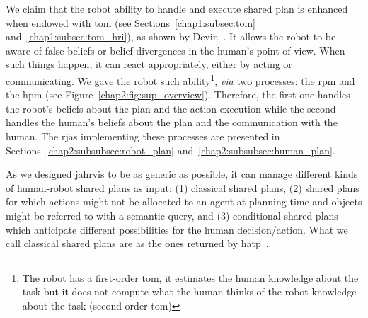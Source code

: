 \documentclass[a4paper,11pt,twoside]{StyleThese}
\begin{document}
We claim that the robot ability to handle and execute shared plan is enhanced when endowed with \acrfull{tom} (see Sections~\ref{chap1:subsec:tom} and~\ref{chap1:subsec:tom_hri}), as shown by Devin~\cite{devin_2016_implemented}. It allows the robot to be aware of false beliefs or belief divergences in the human's point of view. When such things happen, it can react appropriately, either by acting or communicating. We gave the robot such ability\footnote{The robot has a first-order \acrshort{tom}, it estimates the human knowledge about the task but it does not compute what the human thinks of the robot knowledge about the task (second-order \acrshort{tom})}, \textit{via} two processes: the \acrfull{rpm} and the \acrfull{hpm} (see Figure~\ref{chap2:fig:sup_overview}). Therefore, the first one handles the robot's beliefs about the plan and the action execution while the second handles the human's beliefs about the plan and the communication with the human. The \acrshort{rja}s implementing these processes are presented in Sections~\ref{chap2:subsubsec:robot_plan} and~\ref{chap2:subsubsec:human_plan}.

As we designed \acrshort{jahrvis} to be as generic as possible, it can manage different kinds of human-robot shared plans as input: (1) classical shared plans, (2) shared plans for which actions might not be allocated to an agent at planning time and objects might be referred to with a semantic query, and (3) conditional shared plans which anticipate different possibilities for the human decision/action. What we call classical shared plans are as the ones returned by \acrfull{hatp}~\cite{lallement_2014_hatp}. 
\end{document}

